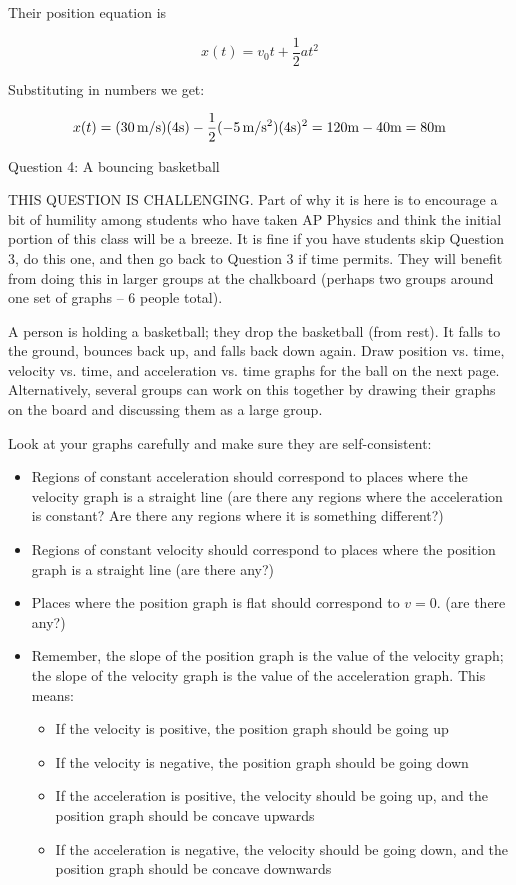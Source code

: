 \documentclass[12pt]{article}
\newcommand{\BI}{\begin{itemize}}
\newcommand{\EI}{\end{itemize}}
\def\BS{\bigskip}
\begin{document}
\begin{enumerate}
{Their position equation is 

$$x(t) = v_0 t + \frac{1}{2}at^2$$

Substituting in numbers we get:

$$x(t) = (30\, \rm m/\rm s) (4 s) - \frac{1}{2}(-5\, \rm m/\rm s^2)(4 s)^2 = 120 m - 40 m = 80 m$$}
	
	\newpage


\centerline{\Large Question 4: A bouncing basketball}

\BS

{\color{Red}THIS QUESTION IS CHALLENGING. Part of why it is here is to encourage a bit of humility among students who have taken AP Physics and think the initial portion of this class will be a breeze. It is fine if you have students skip Question 3, do this one, and then go back to Question 3 if time permits. They will benefit from doing this in larger groups at the chalkboard (perhaps two groups around one set of graphs -- 6 people total).}

A person is holding a basketball; they drop the basketball (from rest). It falls to the ground, bounces back up, and falls back down again. Draw position vs. time, velocity vs. time, and acceleration vs. time graphs for the ball on the next page. Alternatively, several groups can work on this together by drawing their graphs on the board and discussing them as a large group.

Look at your graphs carefully and make sure they are self-consistent:


\BI
\item Regions of constant acceleration should correspond to places where the velocity graph is a straight line (are there any regions where the acceleration is constant? Are there any regions where it is something different?)
\item Regions of constant velocity should correspond to places where the position graph is a straight line (are there any?)
\item Places where the position graph is flat should correspond to $v=0$. (are there any?)
\item Remember, the slope of the position graph is the value of the velocity graph; the slope of the velocity graph is the value of the acceleration graph. This means:
\begin{itemize}
	\item If the velocity is positive, the position graph should be going up
	\item If the velocity is negative, the position graph should be going down
	\item If the acceleration is positive, the velocity should be going up, and the position graph should be concave upwards
	\item If the acceleration is negative, the velocity should be going down, and the position graph should be concave downwards
\end{itemize}
\EI



\end{enumerate}
\end{document}
